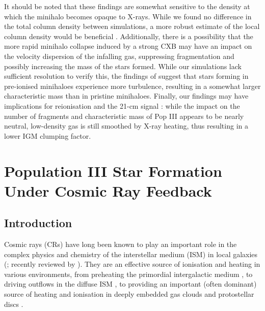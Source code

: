 \documentclass{thesis}
\begin{document}
It should be noted that these findings are somewhat sensitive to the density at which the minihalo becomes opaque to X-rays.  While we found no difference in the total column density between simulations, a more robust estimate of the local column density would be beneficial \citep[e.g.,][]{Hartwigetal2015, Safranek-Shraderetal2012}. Additionally, there is a possibility that the more rapid minihalo collapse induced by a strong CXB may have an impact on the velocity dispersion of the infalling gas, suppressing fragmentation and possibly increasing the mass of the stars formed. While our simulations lack sufficient resolution to verify this, the findings of \citet{Clarketal2011a} suggest that stars forming in pre-ionised minihaloes experience more turbulence, resulting in a somewhat larger characteristic mass than in pristine minihaloes. Finally, our findings may have implications for reionisation and the 21-cm signal \citep{FurlanettoPengBriggs2006, Mirocha2014}: while the impact on the number of fragments and characteristic mass of Pop III appears to be nearly neutral, low-density gas is still smoothed by X-ray heating, thus resulting in a lower IGM clumping factor.


\chapter{Population III Star Formation Under Cosmic Ray Feedback}
\section{Introduction}
\label{intro}

Cosmic rays (CRs) have long been known to play an important role in the complex physics and chemistry of the interstellar medium (ISM) in local galaxies (\citealt{SpitzerTomasko1968,SpitzerScott1969,GlassgoldLanger1973,GoldsmithLanger1978,CravensDalgarno1978,MannheimSchlickeiser1994,Tielens2005}; recently reviewed by \citealt{StrongMoskalenkoPtuskin2007,GrenierBlackStrong2015}).  
They are an effective source of ionisation and heating in various environments, from preheating the primordial intergalactic medium  \citep[IGM;][]{SazonovSunyaev2015}, to driving outflows in the diffuse ISM \citep[e.g.,][]{Ensslinetal2007,Jubelgasetal2008,SalemBryan2014,Hanaszetal2013,Boothetal2013,SalemBryanHummels2014}, to providing an important (often dominant) source of heating and ionisation in deeply embedded gas clouds and protostellar discs \citep{Spitzer1978,DalgarnoYanLiu1999,IndrioloFieldsMcCall2009,PadovaniGalliGlassgold2009,GlassgoldGalliPadovani2012,PadovaniHennebelleGalli2013,Padovanietal2015}. 
\end{document}
